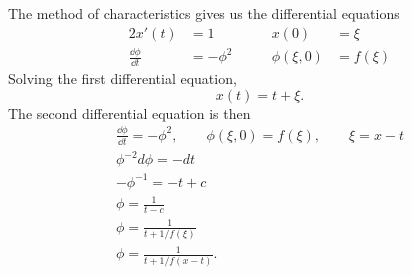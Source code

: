 \begin{Solution}
  The method of characteristics gives us the differential equations
  \begin{alignat*}{2}
    x'(t) &= 1 &\qquad x(0) &= \xi \\
    \frac{\dd \phi}{\dd t} &= -\phi^2 &\qquad \phi(\xi,0) &= f(\xi)
  \end{alignat*}
  Solving the first differential equation,
  \[ x(t) = t +\xi. \]
  The second differential equation is then
  \begin{gather*}
    \frac{\dd \phi}{\dd t} = -\phi^2, \qquad \phi(\xi,0) = f(\xi), \qquad
    \xi = x-t \\
    \phi^{-2} d\phi = - dt \\
    -\phi^{-1} = -t + c \\
    \phi = \frac{1}{t-c} \\
    \phi = \frac{1}{t + 1/f(\xi)} \\
    \boxed{ \phi = \frac{1}{t + 1/f(x-t)}. }
  \end{gather*}
\end{Solution}



